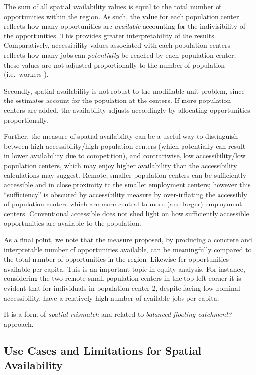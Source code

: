 \documentclass[]{elsarticle} %
\begin{document}
The sum of all spatial availability values is equal to the total number
of opportunities within the region. As such, the value for each
population center reflects how many opportunities are \emph{available}
accounting for the indivisibility of the opportunities. This provides
greater interpretability of the results. Comparatively, accessibility
values associated with each population centers reflects how many jobs
can \emph{potentially} be reached by each population center; these
values are not adjusted proportionally to the number of population
(i.e.~workers ).

Secondly, spatial availability is not robust to the modifiable unit
problem, since the estimates account for the population at the centers.
If more population centers are added, the availability adjusts
accordingly by allocating opportunities proportionally.

Further, the measure of spatial availability can be a useful way to
distinguish between high accessibility/high population centers (which
potentially can result in lower availability due to competition), and
contrariwise, low accessibility/low population centers, which may enjoy
higher availability than the accessibility calculations may suggest.
Remote, smaller population centers can be sufficiently accessible and in
close proximity to the smaller employment centers; however this
``sufficiency'' is obscured by accessibility measure by over-inflating
the accessibly of population centers which are more central to more (and
larger) employment centers. Conventional accessible does not shed light
on how sufficiently accessible opportunities are available to the
population.

As a final point, we note that the measure proposed, by producing a
concrete and interpretable number of opportunities available, can be
meaningfully compared to the total number of opportunities in the
region. Likewise for opportunities available per capita. This is an
important topic in equity analysis. For instance, considering the two
remote small population centers in the top left corner it is evident
that for individuals in population center 2, despite facing low nominal
accessibility, have a relatively high number of available jobs per
capita.

It is a form of \emph{spatial mismatch} and related to \emph{balanced
floating catchment?} approach.

\hypertarget{use-cases-and-limitations-for-spatial-availability}{%
\subsection{Use Cases and Limitations for Spatial
Availability}\label{use-cases-and-limitations-for-spatial-availability}}
\end{document}
